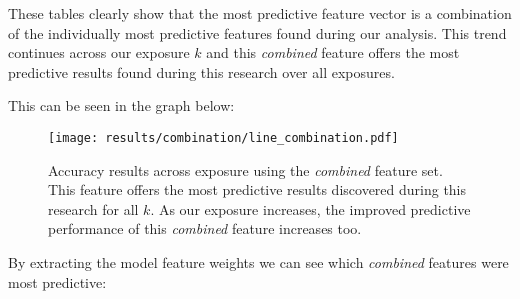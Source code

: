 These tables clearly show that the most predictive feature vector is a combination of the individually most predictive 
features found during our analysis. This trend continues across our exposure $k$ and this \emph{combined} feature offers the most predictive results 
found during this research over all exposures.

This can be seen in the graph below:

\clearpage

\begin{figure}[h]
	\begin{center}
		\texttt{[image: results/combination/line\_combination.pdf]}
		\caption{Accuracy results across exposure using the \emph{combined} feature set. This feature offers the most predictive 
				 results discovered during this research for all $k$. As our exposure increases, the improved predictive performance of this 
				 \emph{combined} feature increases too.}
	\end{center}
\end{figure}

\clearpage

By extracting the model feature weights we can see which \emph{combined} features 
were most predictive:

